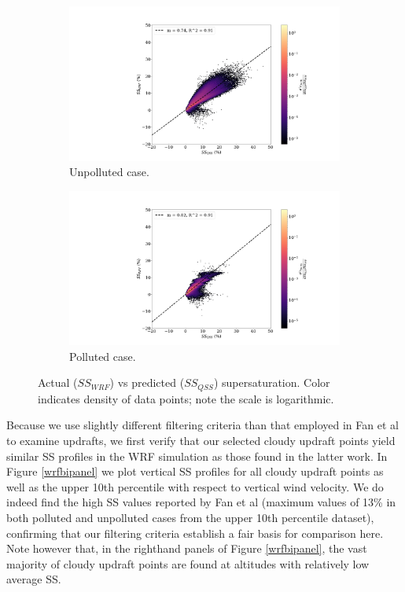 \documentclass{article}
\begin{document}
\begin{figure}[ht]
	\centering
	\begin{subfigure}{0.7\textwidth}
		\includegraphics[width=\textwidth]{revmywrf/v1_FINAL_heatmap_ss_qss_vs_ss_wrf_Unpolluted_figure.png}
		\caption{Unpolluted case.}
		\label{wrfvsqssunpoll}
	\end{subfigure}
	\begin{subfigure}{0.7\textwidth}
		\includegraphics[width=\textwidth]{revmywrf/v1_FINAL_heatmap_ss_qss_vs_ss_wrf_Polluted_figure.png}
		\caption{Polluted case.}
		\label{wrfvsqsspoll}
	\end{subfigure}
	\caption{Actual ($SS_{WRF}$) vs predicted ($SS_{QSS}$) supersaturation. Color indicates density of data points; note the scale is logarithmic.}
	\label{wrfvsqss}
\end{figure}

Because we use slightly different filtering criteria than that employed in Fan et al to examine updrafts, we first verify that our selected cloudy updraft points yield similar SS profiles in the WRF simulation as those found in the latter work. In Figure \ref{wrfbipanel} we plot vertical SS profiles for all cloudy updraft points as well as the upper 10th percentile with respect to vertical wind velocity. We do indeed find the high SS values reported by Fan et al (maximum values of 13\% in both polluted and unpolluted cases from the upper 10th percentile dataset), confirming that our filtering criteria establish a fair basis for comparison here. Note however that, in the righthand panels of Figure \ref{wrfbipanel}, the vast majority of cloudy updraft points are found at altitudes with relatively low average SS.
\end{document}
